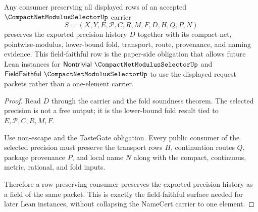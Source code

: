 \begin{theorem}
\label{thm:compact-net-modulus-selector-field-faithful-row}
Any consumer preserving all displayed rows of an accepted $\CompactNetModulusSelectorUp$ carrier
$$
S=(X,Y,E,\mathcal{P},C,R,M,F,D,H,Q,P,N)
$$
preserves the exported precision history $D$ together with its compact-net, pointwise-modulus, lower-bound fold, transport, route, provenance, and naming evidence. This field-faithful row is the paper-side obligation that allows future Lean instances for $\mathsf{Nontrivial}\ \CompactNetModulusSelectorUp$ and $\mathsf{FieldFaithful}\ \CompactNetModulusSelectorUp$ to use the displayed request packets rather than a one-element carrier.
\end{theorem}
\begin{proof}
Read $D$ through the carrier and the fold soundness theorem. The selected precision is not a free output; it is the lower-bound fold result tied to $E,\mathcal{P},C,R,M,F$.

Use non-escape and the TasteGate obligation. Every public consumer of the selected precision must preserve the transport rows $H$, continuation routes $Q$, package provenance $P$, and local name $N$ along with the compact, continuous, metric, rational, and fold inputs.

Therefore a row-preserving consumer preserves the exported precision history as a field of the same packet. This is exactly the field-faithful surface needed for later Lean instances, without collapsing the NameCert carrier to one element.
\end{proof}

